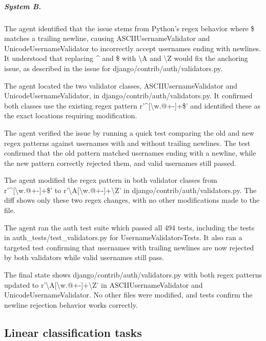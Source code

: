 \documentclass{article}
\begin{document}
\subparagraph{System B.}
\begin{description}[itemsep=1pt, topsep=2pt]\small
\item[understanding] The agent identified that the issue stems from Python's regex behavior where \$ matches a trailing newline, causing ASCIIUsernameValidator and UnicodeUsernameValidator to incorrectly accept usernames ending with newlines. It understood that replacing \textasciicircum{} and \$ with \textbackslash{}A and \textbackslash{}Z would fix the anchoring issue, as described in the issue for django/contrib/auth/validators.py.
\item[localization] The agent located the two validator classes, ASCIIUsernameValidator and UnicodeUsernameValidator, in django/contrib/auth/validators.py. It confirmed both classes use the existing regex pattern r'\textasciicircum{}[\textbackslash{}w.@+-]+\$' and identified these as the exact locations requiring modification.
\item[reproduction] The agent verified the issue by running a quick test comparing the old and new regex patterns against usernames with and without trailing newlines. The test confirmed that the old pattern matched usernames ending with a newline, while the new pattern correctly rejected them, and valid usernames still passed.
\item[editing] The agent modified the regex pattern in both validator classes from r'\textasciicircum{}[\textbackslash{}w.@+-]+\$' to r'\textbackslash{}A[\textbackslash{}w.@+-]+\textbackslash{}Z' in django/contrib/auth/validators.py. The diff shows only these two regex changes, with no other modifications made to the file.
\item[verification] The agent ran the auth test suite which passed all 494 tests, including the tests in auth\_tests/test\_validators.py for UsernameValidatorsTests. It also ran a targeted test confirming that usernames with trailing newlines are now rejected by both validators while valid usernames still pass.
\item[final state] The final state shows django/contrib/auth/validators.py with both regex patterns updated to r'\textbackslash{}A[\textbackslash{}w.@+-]+\textbackslash{}Z' in ASCIIUsernameValidator and UnicodeUsernameValidator. No other files were modified, and tests confirm the newline rejection behavior works correctly.
\end{description}

\subsection{Linear classification tasks}
\label{app:probes}
\end{document}
